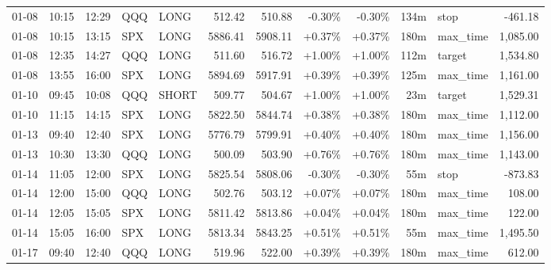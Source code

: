\documentclass[11pt,a4paper,twoside]{article}
\begin{document}
\begin{center}
\begin{longtable}{>{\color{txtmain}}l l l l l r r r r r >{\color{txtmain}}l r}
01-08 & 10:15 & 12:29 & QQQ & LONG & 512.42 & 510.88 & \textcolor{lossred}{-0.30\%} & \textcolor{lossred}{-0.30\%} & 134m & stop & \textcolor{lossred}{-461.18} \\
01-08 & 10:15 & 13:15 & SPX & LONG & 5886.41 & 5908.11 & \textcolor{wingreen}{+0.37\%} & \textcolor{wingreen}{+0.37\%} & 180m & max\_time & \textcolor{wingreen}{1,085.00} \\
01-08 & 12:35 & 14:27 & QQQ & LONG & 511.60 & 516.72 & \textcolor{wingreen}{+1.00\%} & \textcolor{wingreen}{+1.00\%} & 112m & target & \textcolor{wingreen}{1,534.80} \\
01-08 & 13:55 & 16:00 & SPX & LONG & 5894.69 & 5917.91 & \textcolor{wingreen}{+0.39\%} & \textcolor{wingreen}{+0.39\%} & 125m & max\_time & \textcolor{wingreen}{1,161.00} \\
01-10 & 09:45 & 10:08 & QQQ & SHORT & 509.77 & 504.67 & \textcolor{wingreen}{+1.00\%} & \textcolor{wingreen}{+1.00\%} & 23m & target & \textcolor{wingreen}{1,529.31} \\
01-10 & 11:15 & 14:15 & SPX & LONG & 5822.50 & 5844.74 & \textcolor{wingreen}{+0.38\%} & \textcolor{wingreen}{+0.38\%} & 180m & max\_time & \textcolor{wingreen}{1,112.00} \\
01-13 & 09:40 & 12:40 & SPX & LONG & 5776.79 & 5799.91 & \textcolor{wingreen}{+0.40\%} & \textcolor{wingreen}{+0.40\%} & 180m & max\_time & \textcolor{wingreen}{1,156.00} \\
01-13 & 10:30 & 13:30 & QQQ & LONG & 500.09 & 503.90 & \textcolor{wingreen}{+0.76\%} & \textcolor{wingreen}{+0.76\%} & 180m & max\_time & \textcolor{wingreen}{1,143.00} \\
01-14 & 11:05 & 12:00 & SPX & LONG & 5825.54 & 5808.06 & \textcolor{lossred}{-0.30\%} & \textcolor{lossred}{-0.30\%} & 55m & stop & \textcolor{lossred}{-873.83} \\
01-14 & 12:00 & 15:00 & QQQ & LONG & 502.76 & 503.12 & \textcolor{wingreen}{+0.07\%} & \textcolor{wingreen}{+0.07\%} & 180m & max\_time & \textcolor{wingreen}{108.00} \\
01-14 & 12:05 & 15:05 & SPX & LONG & 5811.42 & 5813.86 & \textcolor{wingreen}{+0.04\%} & \textcolor{wingreen}{+0.04\%} & 180m & max\_time & \textcolor{wingreen}{122.00} \\
01-14 & 15:05 & 16:00 & SPX & LONG & 5813.34 & 5843.25 & \textcolor{wingreen}{+0.51\%} & \textcolor{wingreen}{+0.51\%} & 55m & max\_time & \textcolor{wingreen}{1,495.50} \\
01-17 & 09:40 & 12:40 & QQQ & LONG & 519.96 & 522.00 & \textcolor{wingreen}{+0.39\%} & \textcolor{wingreen}{+0.39\%} & 180m & max\_time & \textcolor{wingreen}{612.00} \\

\end{longtable}
\end{center}
\end{document}
